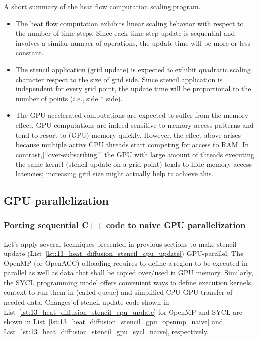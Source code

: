 \par
A short summary of the heat flow computation scaling program.
\begin{itemize}
    \item The heat flow computation exhibits linear scaling behavior with respect to the number of time steps. Since each time-step update is sequential and involves a similar number of operations, the update time will be more or less constant.
    \item The stencil application (grid update) is expected to exhibit quadratic scaling character respect to the size of grid side. Since stencil application is independent for every grid point, the update time will be proportional to the number of points ($i.e.$, side * side).
    \item The GPU-accelerated computations are expected to suffer from the memory effect. GPU computations are indeed sensitive to memory access patterns and tend to resort to (GPU) memory quickly. However, the effect above arises because multiple active CPU threads start competing for access to RAM. In contrast,|\lq\lq over-subscribing\rq\rq~the GPU with large amount of threads executing the same kernel (stencil update on a grid point) tends to hide memory access latencies; increasing grid size might actually help to achieve this.
\end{itemize}




\subsection{GPU parallelization}


\subsubsection{Porting sequential C++ code to naive GPU parallelization}


\par
Let’s apply several techniques presented in previous sections to make stencil update (List~\ref{lst:13_heat_diffusion_stencil_cpu_update}) GPU-parallel.
The OpenMP (or OpenACC) offloading requires to define a region to be executed in parallel as well as data that shall be copied over/used in GPU memory.
Similarly, the SYCL programming model offers convenient ways to define execution kernels, context to run them in (called queue) and simplified CPU-GPU transfer of needed data.
Changes of stencil update code shown in List~\ref{lst:13_heat_diffusion_stencil_cpu_update} for OpenMP and SYCL are shown in List~\ref{lst:13_heat_diffusion_stencil_gpu_openmp_naive} and List~\ref{lst:13_heat_diffusion_stencil_gpu_sycl_naive}, respectively.


